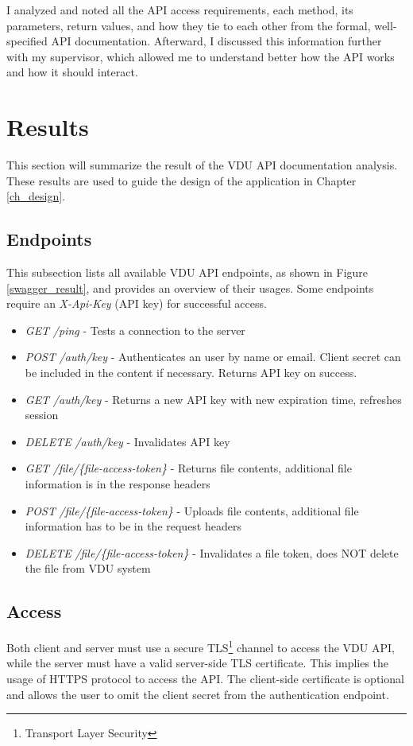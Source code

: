 I analyzed and noted all the API access requirements, each method, its parameters, return values, and how they tie to each other from the formal, well-specified API documentation. Afterward, I discussed this information further with my supervisor, which allowed me to understand better how the API works and how it should interact.

\section{Results}
\label{analysis_results}
This section will summarize the result of the VDU API documentation analysis. These results are used to guide the design of the application in Chapter \ref{ch_design}.

\subsection{Endpoints}
This subsection lists all available VDU API endpoints, as shown in Figure \ref{swagger_result}, and provides an overview of their usages. Some endpoints require an \textit{X-Api-Key} (API key) for successful access.

\begin{itemize}
    \item \textit{GET} \textit{/ping} - Tests a connection to the server
    \item \textit{POST} \textit{/auth/key} - Authenticates an user by name or email. Client secret can be included in the content if necessary. Returns API key on success.
    \item \textit{GET} \textit{/auth/key} - Returns a new API key with new expiration time, refreshes session
    \item \textit{DELETE} \textit{/auth/key} - Invalidates API key
    \item \textit{GET} \textit{/file/\{file-access-token\}} - Returns file contents, additional file information is in the response headers
    \item \textit{POST} \textit{/file/\{file-access-token\}} - Uploads file contents, additional file information has to be in the request headers
    \item \textit{DELETE} \textit{/file/\{file-access-token\}} - Invalidates a file token, does NOT delete the file from VDU system
\end{itemize}

\subsection{Access}
Both client and server must use a secure TLS\footnote{Transport Layer Security} channel to access the VDU API, while the server must have a valid server-side TLS certificate. This implies the usage of HTTPS protocol to access the API. The client-side certificate is optional and allows the user to omit the client secret from the authentication endpoint.

